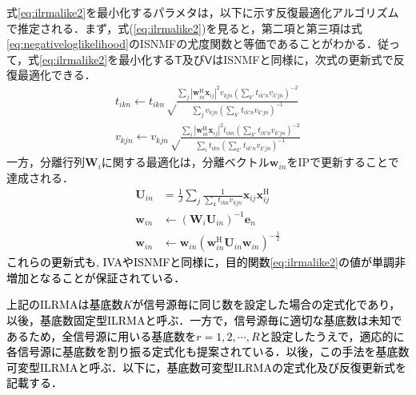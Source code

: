式\eqref{eq:ilrmalike2}を最小化するパラメタは，以下に示す反復最適化アルゴリズムで推定される．まず，式(\ref{eq:ilrmalike2})を見ると，第二項と第三項は式\eqref{eq:negativeloglikelihood}のISNMFの尤度関数と等価であることがわかる．従って，式\eqref{eq:ilrmalike2}を最小化する$\mathsf{T}$及び$\mathsf{V}$はISNMFと同様に，次式の更新式で反復最適化できる．
\begin{align}
    t_{ikn} \leftarrow t_{ikn} \sqrt \frac{ \sum_j |\bm{w}_{in}^{\mathrm{H}}\bm{x}_{ij}|^2 v_{kjn} \left( \sum_{k'} t_{ik'n} v_{k'jn} \right)^{-2} }{ \sum_j v_{kjn} \left( \sum_{k'} t_{ik'n} v_{k'jn} \right)^{-1} } \label{eq:MUTilrma} \\
    v_{kjn} \leftarrow v_{kjn} \sqrt \frac{ \sum_i |\bm{w}_{in}^{\mathrm{H}}\bm{x}_{ij}|^2 t_{ikn} \left( \sum_{k'} t_{ik'n} v_{k'jn} \right)^{-2} }{ \sum_i t_{ikn} \left( \sum_{k'} t_{ik'n} v_{k'jn} \right)^{-1} } \label{eq:MUVilrma}
\end{align}
一方，分離行列$\bm{W}_i$に関する最適化は，分離ベクトル$\bm{w}_{in}$をIPで更新することで達成される．
\begin{align}
\bm{U}_{in} &= \frac{1}{J} \sum_j \frac{1}{\sum_{k}t_{ikn}v_{kjn}} \bm{x}_{ij} \bm{x}_{ij}^{\mathrm{H}} \label{eq:ip1} \\
\bm{w}_{in} &\leftarrow (\bm{W}_i \bm{U}_{in})^{-1} \bm{e}_n \label{eq:ip2} \\
\bm{w}_{in} &\leftarrow \bm{w}_{in} ( \bm{w}_{in}^{\mathrm{H}} \bm{U}_{in} \bm{w}_{in} )^{-\frac{1}{2}} \label{eq:ip3}
\end{align}
\textcolor{black}{これらの更新式も, IVAやISNMFと同様に，目的関数\eqref{eq:ilrmalike2}の値が単調非増加となることが保証されている．}

\textcolor{black}{上記のILRMAは基底数$K$が信号源毎に同じ数を設定した場合の定式化であり，以後，基底数固定型ILRMAと呼ぶ．一方で，信号源毎に適切な基底数は未知であるため，全信号源に用いる基底数を$r=1, 2, \cdots, R$と設定したうえで，適応的に各信号源に基底数を割り振る定式化も提案されている．以後，この手法を基底数可変型ILRMAと呼ぶ．以下に，基底数可変型ILRMAの定式化及び反復更新式を記載する．}

